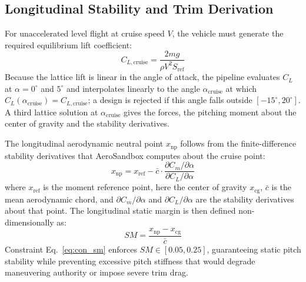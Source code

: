 \subsection{Longitudinal Stability and Trim Derivation}
For unaccelerated level flight at cruise speed $V$, the vehicle must generate the required equilibrium lift coefficient:
\begin{equation}
C_{L,\mathrm{cruise}} = \frac{2 m g}{\rho V^2 S_{\mathrm{ref}}}
\end{equation}
Because the lattice lift is linear in the angle of attack, the pipeline evaluates $C_L$ at $\alpha = 0^\circ$ and $5^\circ$ and interpolates linearly to the angle $\alpha_{\mathrm{cruise}}$ at which $C_L(\alpha_{\mathrm{cruise}}) = C_{L,\mathrm{cruise}}$; a design is rejected if this angle falls outside $[-15^\circ, 20^\circ]$. A third lattice solution at $\alpha_{\mathrm{cruise}}$ gives the forces, the pitching moment about the center of gravity and the stability derivatives.

The longitudinal aerodynamic neutral point $x_{\mathrm{np}}$ follows from the finite-difference stability derivatives that AeroSandbox computes about the cruise point:
\begin{equation}
x_{\mathrm{np}} = x_{\mathrm{ref}} - \bar{c} \cdot \frac{\partial C_m / \partial \alpha}{\partial C_L / \partial \alpha}
\end{equation}
where $x_{\mathrm{ref}}$ is the moment reference point, here the center of gravity $x_{\mathrm{cg}}$, $\bar{c}$ is the mean aerodynamic chord, and $\partial C_m / \partial \alpha$ and $\partial C_L / \partial \alpha$ are the stability derivatives about that point. The longitudinal static margin is then defined non-dimensionally as:
\begin{equation}
SM = \frac{x_{\mathrm{np}} - x_{\mathrm{cg}}}{\bar{c}}
\end{equation}
Constraint Eq.~\eqref{eq:con_sm} enforces $SM \in [0.05, 0.25]$, guaranteeing static pitch stability while preventing excessive pitch stiffness that would degrade maneuvering authority or impose severe trim drag.

